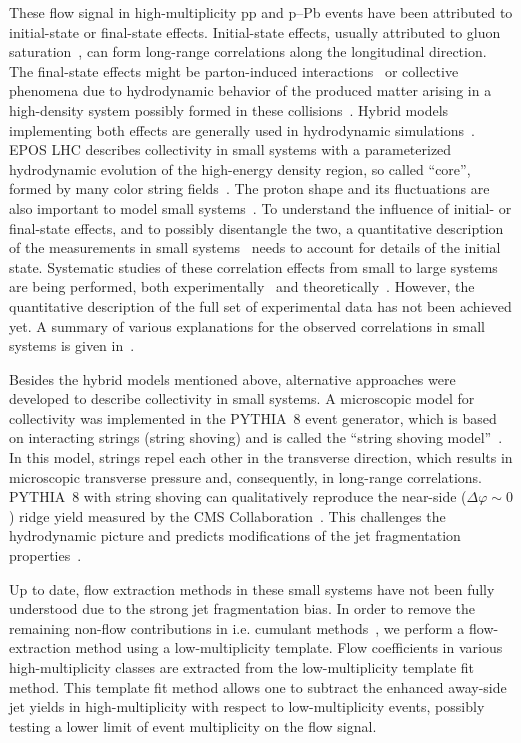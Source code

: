 These flow signal in high-multiplicity pp and p--Pb events have been attributed to initial-state or final-state effects. Initial-state effects, usually attributed to gluon saturation~\cite{Dusling:2012cg,Bzdak:2013zma}, can form long-range
correlations along the longitudinal direction. The final-state effects might be parton-induced interactions~\cite{Arbuzov:2011yr} or collective phenomena due to hydrodynamic behavior of the produced matter arising in a high-density system possibly formed in these collisions~\cite{Weller:2017tsr,Zhao:2017rgg}. 
Hybrid models implementing both effects are generally used in hydrodynamic simulations~\cite{Greif:2017bnr,Mantysaari:2017cni}. EPOS LHC describes collectivity in small systems with a parameterized hydrodynamic evolution of the high-energy density region, so called ``core'', formed by many color string fields~\cite{Pierog:2013ria}.
The proton shape and its fluctuations are also important to model small systems~\cite{Mantysaari:2017cni}.
To understand the influence of initial- or final-state effects, and to possibly disentangle the two, a quantitative description of the measurements in small systems~\cite{Schenke:2019pmk,Schenke:2020mbo} needs to account for details of the initial state.
Systematic studies of these correlation effects from small to large systems are being performed, both experimentally~\cite{Acharya:2019vdf} and theoretically~\cite{Schenke:2020mbo}.
However, the quantitative description of the full set of experimental data has not been achieved yet.
A summary of various explanations for the observed correlations in small systems is given in~\cite{Strickland:2018exs,Loizides:2016tew,Nagle:2018nvi,Loizides:2016tew}.

Besides the hybrid models mentioned above, alternative approaches were developed to describe collectivity in small systems. A microscopic model for collectivity was implemented in the PYTHIA~8 event generator, which is based on interacting strings (string shoving) and is called the “string shoving model”~\cite{Bierlich:2017vhg}. In this model, strings repel each other in the transverse direction, which results in microscopic transverse pressure and, consequently, in long-range correlations. PYTHIA~8 with string shoving can qualitatively reproduce the near-side ($\Delta\varphi\sim0$) ridge yield measured by the CMS Collaboration~\cite{Khachatryan:2016txc}. This challenges the hydrodynamic picture and predicts modifications of the jet fragmentation properties~\cite{Bierlich:2019ixq}.

Up to date, flow extraction methods in these small systems have not been fully understood due to the strong jet fragmentation bias. In order to remove the remaining non-flow contributions in i.e. cumulant methods~\cite{}, we perform a flow-extraction method using a low-multiplicity template. Flow coefficients in various high-multiplicity classes are extracted from the low-multiplicity template fit method. This template fit method allows one to subtract the enhanced away-side jet yields in high-multiplicity with respect to low-multiplicity events, possibly testing a lower limit of event multiplicity on the flow signal.

